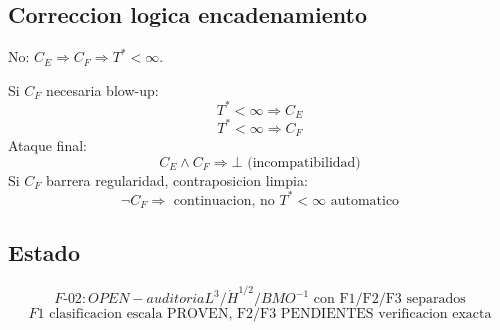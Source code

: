 \documentclass[11pt]{article}
\begin{document}
\subsection*{Correccion logica encadenamiento}
No: $C_E\Rightarrow C_F\Rightarrow T^*<\infty$.

Si $C_F$ necesaria blow-up:
\[
\boxed{T^*<\infty\Rightarrow C_E}
\]
\[
\boxed{T^*<\infty\Rightarrow C_F}
\]
Ataque final:
\[
\boxed{C_E\land C_F\Rightarrow\bot\text{ (incompatibilidad)}}
\]
Si $C_F$ barrera regularidad, contraposicion limpia:
\[
\boxed{\neg C_F\Rightarrow\text{ continuacion, no }T^*<\infty\text{ automatico}}
\]

\subsection*{Estado}
\[
\boxed{F\text{-}02: OPEN - auditoria }L^3/\dot H^{1/2}/BMO^{-1}\text{ con F1/F2/F3 separados}
\]
\[
\boxed{F1\text{ clasificacion escala PROVEN, F2/F3 PENDIENTES verificacion exacta}}
\]
\end{document}
